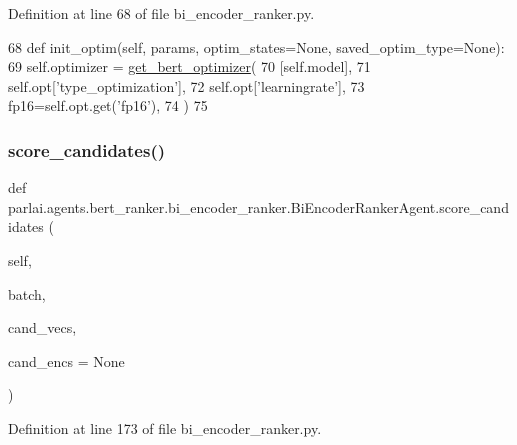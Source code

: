 Definition at line 68 of file bi\+\_\+encoder\+\_\+ranker.\+py.


\begin{DoxyCode}
68     \textcolor{keyword}{def }init\_optim(self, params, optim\_states=None, saved\_optim\_type=None):
69         self.optimizer = \hyperlink{namespaceparlai_1_1agents_1_1bert__ranker_1_1helpers_a7a144c1f6c9af7925e754b9b61c0e6fb}{get\_bert\_optimizer}(
70             [self.model],
71             self.opt[\textcolor{stringliteral}{'type\_optimization'}],
72             self.opt[\textcolor{stringliteral}{'learningrate'}],
73             fp16=self.opt.get(\textcolor{stringliteral}{'fp16'}),
74         )
75 
\end{DoxyCode}
\mbox{\label{classparlai_1_1agents_1_1bert__ranker_1_1bi__encoder__ranker_1_1BiEncoderRankerAgent_ac8141b70cff9c26b945d112ad53b035c}} 
\subsubsection{\texorpdfstring{score\+\_\+candidates()}{score\_candidates()}}
{\footnotesize\ttfamily def parlai.\+agents.\+bert\+\_\+ranker.\+bi\+\_\+encoder\+\_\+ranker.\+Bi\+Encoder\+Ranker\+Agent.\+score\+\_\+candidates (\begin{DoxyParamCaption}\item[{}]{self,  }\item[{}]{batch,  }\item[{}]{cand\+\_\+vecs,  }\item[{}]{cand\+\_\+encs = {\ttfamily None} }\end{DoxyParamCaption})}



Definition at line 173 of file bi\+\_\+encoder\+\_\+ranker.\+py.


